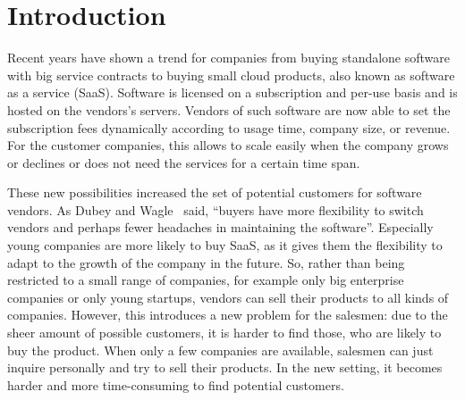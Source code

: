 

\section{Introduction}
\label{sec:introduction}

Recent years have shown a trend for companies from buying standalone software with big service contracts to buying small cloud products, also known as software as a service (SaaS).
Software is licensed on a subscription and per-use basis and is hosted on the vendors's servers.
Vendors of such software are now able to set the subscription fees dynamically according to usage time, company size, or revenue.
For the customer companies, this allows to scale easily when the company grows or declines or does not need the services for a certain time span.

These new possibilities increased the set of potential customers for software vendors.
As Dubey and Wagle~\cite{dubey2007delivering} said, ``buyers have more flexibility to switch vendors and perhaps fewer headaches in maintaining the software''.
Especially young companies are more likely to buy SaaS, as it gives them the flexibility to adapt to the growth of the company in the future.
So, rather than being restricted to a small range of companies, for example only big enterprise companies or only young startups, vendors can sell their products to all kinds of companies.
However, this introduces a new problem for the salesmen: due to the sheer amount of possible customers, it is harder to find those, who are likely to buy the product.
When only a few companies are available, salesmen can just inquire personally and try to sell their products.
In the new setting, it becomes harder and more time-consuming to find potential customers.

